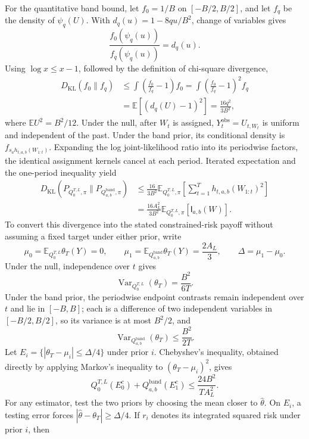 For the quantitative band bound, let \(f_0=1/B\) on \([-B/2,B/2]\), and let \(f_q\) be the density of \(\psi_q(U)\).  With \(d_q(u)=1-8qu/B^2\), change of variables gives
\[
 \frac{f_0(\psi_q(u))}{f_q(\psi_q(u))}=d_q(u).
\]
Using \(\log x\le x-1\), followed by the definition of chi-square divergence,
\[
 \begin{aligned}
 D_{\mathrm{KL}}(f_0\|f_q)
 &\le \int\left(\frac{f_0}{f_q}-1\right)f_0
 =\int\left(\frac{f_0}{f_q}-1\right)^2f_q\\
 &=\mathbb E[(d_q(U)-1)^2]
 =\frac{16q^2}{3B^2},
 \end{aligned}
\]
where \(\mathbb EU^2=B^2/12\).  Under the null, after \(W_t\) is assigned, \(Y_t^{\mathrm{obs}}=U_{t,W_t}\) is uniform and independent of the past.  Under the band prior, its conditional density is \(f_{s_ah_{t,a,b}(W_{1:t})}\).  Expanding the log joint-likelihood ratio into its periodwise factors, the identical assignment kernels cancel at each period.  Iterated expectation and the one-period inequality yield
\[
 \begin{aligned}
 D_{\mathrm{KL}}\!\left(
 P_{Q_0^{T,L},\pi}\|P_{Q_{a,b}^{\mathrm{band}},\pi}
 \right)
 &\le \frac{16}{3B^2}
 \mathbb E_{Q_0^{T,L},\pi}
 \left[\sum_{t=1}^T h_{t,a,b}(W_{1:t})^2\right]\\
 &=\frac{16A_L^2}{3B^2}
 \mathbb E_{Q_0^{T,L},\pi}[\mathsf I_{a,b}(W)].
 \end{aligned}
\]
To convert this divergence into the stated constrained-risk payoff without assuming a fixed target under either prior, write
\[
 \mu_0=\mathbb E_{Q_0^{T,L}}\theta_T(Y)=0,
 \qquad
 \mu_1=\mathbb E_{Q_{a,b}^{\mathrm{band}}}\theta_T(Y)=\frac{2A_L}{3},
 \qquad
 \Delta=\mu_1-\mu_0.
\]
Under the null, independence over \(t\) gives
\[
 \operatorname{Var}_{Q_0^{T,L}}(\theta_T)=\frac{B^2}{6T}.
\]
Under the band prior, the periodwise endpoint contrasts remain independent over \(t\) and lie in \([-B,B]\); each is a difference of two independent variables in \([-B/2,B/2]\), so its variance is at most \(B^2/2\), and
\[
 \operatorname{Var}_{Q_{a,b}^{\mathrm{band}}}(\theta_T)\le\frac{B^2}{2T}.
\]
Let \(E_i=\{|\theta_T-\mu_i|\le\Delta/4\}\) under prior \(i\).  Chebyshev's inequality, obtained directly by applying Markov's inequality to \((\theta_T-\mu_i)^2\), gives
\[
 Q_0^{T,L}(E_0^c)+Q_{a,b}^{\mathrm{band}}(E_1^c)
 \le \frac{24B^2}{TA_L^2}.
\]
For any estimator, test the two priors by choosing the mean closer to \(\widehat\theta\).  On \(E_i\), a testing error forces \(|\widehat\theta-\theta_T|\ge\Delta/4\).  If \(r_i\) denotes its integrated squared risk under prior \(i\), then
